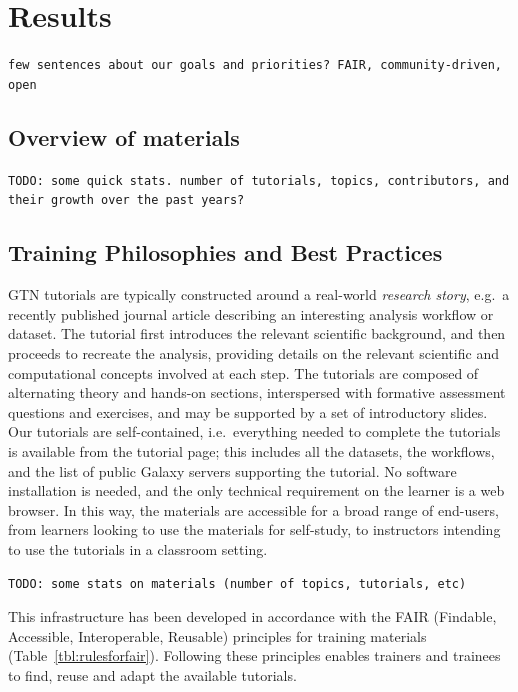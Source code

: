 \documentclass[10pt,letterpaper]{article}
\begin{document}
\section*{Results}

\verb+few sentences about our goals and priorities? FAIR, community-driven, open+


\subsection*{Overview of materials}

\verb+TODO: some quick stats. number of tutorials, topics, contributors, and their growth over the past years?+



\subsection*{Training Philosophies and Best Practices}

GTN tutorials are typically constructed around a real-world \emph{research story}, e.g.\ a recently published journal article describing an interesting analysis workflow or dataset.
The tutorial first introduces the relevant scientific background, and then proceeds to recreate the analysis, providing details on the relevant scientific and computational concepts involved at each step.
The tutorials are composed of alternating theory and hands-on sections, interspersed with formative assessment questions and exercises, and may be supported by a set of introductory slides.
Our tutorials are self-contained, i.e.\ everything needed to complete the tutorials is available from the tutorial page; this includes all the datasets, the workflows, and the list of public Galaxy servers supporting the tutorial. No software installation is needed, and the only technical requirement on the learner is a web browser.
In this way, the materials are accessible for a broad range of end-users, from learners looking to use the materials for self-study, to instructors intending to use the tutorials in a classroom setting.

\verb+TODO: some stats on materials (number of topics, tutorials, etc)+


This infrastructure has been developed in accordance with the FAIR (Findable, Accessible, Interoperable, Reusable) principles for training materials \cite{Garcia2020} (Table~\ref{tbl:rulesforfair}).
Following these principles enables trainers and trainees to find, reuse and adapt the available tutorials.
\end{document}
